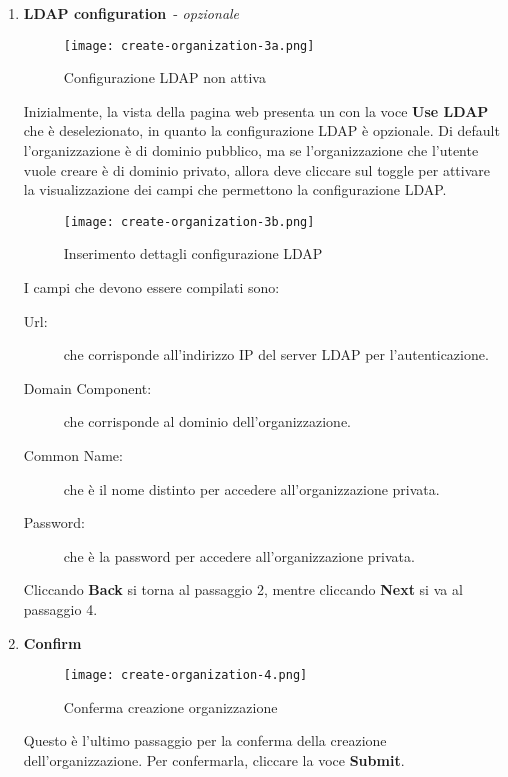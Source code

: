 \documentclass[../manuale-utente.tex]{subfiles}
\begin{document}
\begin{enumerate}
    \item \textbf{LDAP configuration}~- \textit{opzionale}

    \begin{figure}[H]
      \centering
      \texttt{[image: create-organization-3a.png]}
      \caption{Configurazione LDAP non attiva}%
      \label{fig:web_app_configurazione_ldap_non_attiva}
    \end{figure}
    Inizialmente, la vista della pagina web presenta un  con la voce \textbf{Use LDAP} che è deselezionato, in quanto la configurazione LDAP è opzionale.
    Di default l'organizzazione è di dominio pubblico, ma se l'organizzazione che l'utente vuole creare è di dominio privato, allora deve cliccare sul toggle per attivare la visualizzazione dei campi che permettono la configurazione LDAP\@.
    \begin{figure}[H]
      \centering
      \texttt{[image: create-organization-3b.png]}
      \caption{Inserimento dettagli configurazione LDAP}%
      \label{fig:web_app_inserimento_dettagli_configurazione_ldap}
    \end{figure}
    I campi che devono essere compilati sono:
    \begin{description}
      \item[Url:] che corrisponde all'indirizzo IP del server LDAP per l'autenticazione.
      \item[Domain Component:]  che corrisponde al dominio dell'organizzazione.
      \item[Common Name:] che è il nome distinto per accedere all'organizzazione privata.
      \item[Password:] che è la password per accedere all'organizzazione privata.
  \end{description}
    Cliccando \textbf{Back} si torna al passaggio 2, mentre cliccando \textbf{Next} si va al passaggio 4.

    \item \textbf{Confirm}

    \begin{figure}[H]
        \centering
        \texttt{[image: create-organization-4.png]}
        \caption{Conferma creazione organizzazione}%
        \label{fig:web_app_conferma_organizzazione}
    \end{figure}
    Questo è l'ultimo passaggio per la conferma della creazione dell'organizzazione. Per confermarla, cliccare la voce \textbf{Submit}.
\end{enumerate}
\end{document}
